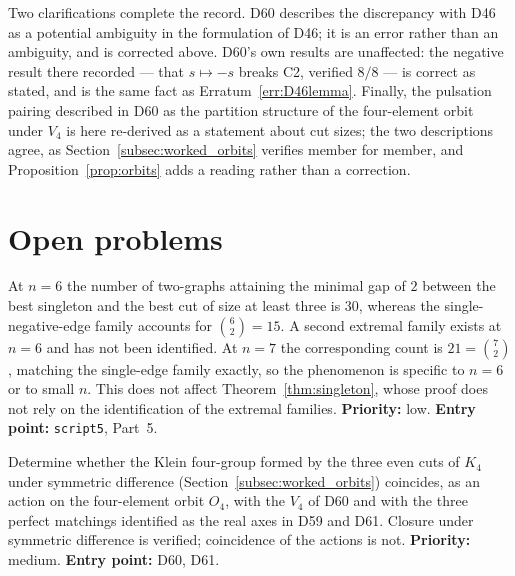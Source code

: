 \documentclass[11pt,a4paper]{article}
\def\mathcal#1{#1}%
\newcommand{\Kfour}{K_4}
\begin{document}
Two clarifications complete the record. D60 describes the discrepancy with D46 as a potential ambiguity in the formulation of D46; it is an error rather than an ambiguity, and is corrected above. D60's own results are unaffected: the negative result there recorded --- that $s\mapsto-s$ breaks C2, verified $8/8$ --- is correct as stated, and is the same fact as Erratum~\ref{err:D46lemma}. Finally, the pulsation pairing described in D60 as the partition structure of the four-element orbit under $V_4$ is here re-derived as a statement about cut sizes; the two descriptions agree, as Section~\ref{subsec:worked_orbits} verifies member for member, and Proposition~\ref{prop:orbits} adds a reading rather than a correction.

\section{Open problems}
\label{sec:open}

\begin{openprobbox}
At $n=6$ the number of two-graphs attaining the minimal gap of $2$ between the best singleton and the best cut of size at least three is $30$, whereas the single-negative-edge family accounts for $\binom{6}{2}=15$. A second extremal family exists at $n=6$ and has not been identified. At $n=7$ the corresponding count is $21=\binom{7}{2}$, matching the single-edge family exactly, so the phenomenon is specific to $n=6$ or to small $n$. This does not affect Theorem~\ref{thm:singleton}, whose proof does not rely on the identification of the extremal families. \textbf{Priority:} low. \textbf{Entry point:} \texttt{script5}, Part~5.
\end{openprobbox}

\begin{openprobbox}
Determine whether the Klein four-group formed by the three even cuts of $\Kfour$ under symmetric difference (Section~\ref{subsec:worked_orbits}) coincides, as an action on the four-element orbit $\mathcal{O}_4$, with the $V_4$ of D60 and with the three perfect matchings identified as the real axes in D59 and D61. Closure under symmetric difference is verified; coincidence of the actions is not. \textbf{Priority:} medium. \textbf{Entry point:} D60, D61.
\end{openprobbox}
\end{document}
